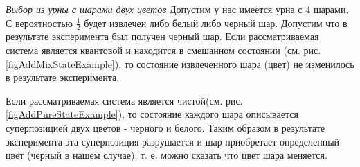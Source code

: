 \begin{example}
\emph{Выбор из урны с шарами двух цветов}
Допустим у нас имеется урна с 4 шарами. С вероятностью $\frac{1}{2}$
будет извлечен либо белый либо черный шар. Допустим что в результате
эксперимента был получен черный шар. Если рассматриваемая система
является квантовой и находится в смешанном состоянии 
(см. рис. \ref{figAddMixStateExample}), то состояние
извлеченного шара (цвет) не изменилось в результате эксперимента. 




Если рассматриваемая система является
чистой(см. рис. \ref{figAddPureStateExample}), то состояние каждого
шара описывается суперпозицией двух цветов - черного и белого. Таким
образом в результате эксперимента эта суперпозиция разрушается и шар
приобретает определенный цвет (черный в нашем случае), т. е. можно
сказать что цвет шара меняется.
\end{example}
